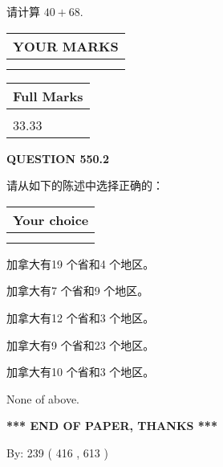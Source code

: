 \documentclass{ctexart}
\begin{document}
  
 
请计算 $ %
40 +  %
68 $.
 

 

 
  
\vspace{0.2in}
  
\noindent\begin{tabular}{|l|}
\hline
 YOUR MARKS  \\
\hline
 \\ 
 \\ 
\hline
\end{tabular}
\hspace{0.05in} \begin{tabular}{|l|}
\hline
 Full Marks  \\
\hline
 \\ 
33.33 \\
\hline
\end{tabular}
{\textbf{\Large{QUESTION
550.2 
}}}
  
  
请从如下的陈述中选择正确的：
  
  
\noindent\hspace{3.0in} \begin{tabular}{|l|}
\hline
Your choice \\
\hline
 \\ 
 \\ 
\hline
\end{tabular}
  
  
 
 
加拿大有19 个省和4 个地区。
 
 
加拿大有7 个省和9 个地区。
 
 
加拿大有12 个省和3 个地区。
 
 
加拿大有9 个省和23 个地区。
 
 
加拿大有10 个省和3 个地区。
 
 
 None of above.
 
 
   
   
 \vspace{0.2in}
 
   
   
   
   
\vspace{1.0in} 
{\textbf{\large{ *** END OF PAPER, THANKS *** }}} 
   
   
\hspace{1.0in} By: 
 239 ( 416 ,  613 )
   
\end{document}
